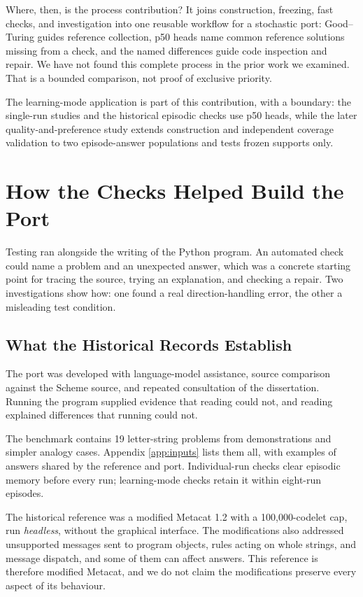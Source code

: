 \documentclass[10pt,letterpaper]{article}
\begin{document}
Where, then, is the process contribution? It joins construction, freezing, fast checks,
and investigation into one reusable workflow for a stochastic port: Good--Turing guides
reference collection, p50 heads name common reference solutions missing from a check, and
the named differences guide code inspection and repair. We have not found this complete
process in the prior work we examined. That is a bounded comparison, not proof of
exclusive priority.

The learning-mode application is part of this contribution, with a boundary: the
single-run studies and the historical episodic checks use p50 heads, while the later
quality-and-preference study extends construction and independent coverage validation to
two episode-answer populations and tests frozen supports only.

\section{How the Checks Helped Build the Port}\label{sec:case}

Testing ran alongside the writing of the Python program. An automated check could name a
problem and an unexpected answer, which was a concrete starting point for tracing the
source, trying an explanation, and checking a repair. Two investigations show how: one
found a real direction-handling error, the other a misleading test condition.

\subsection{What the Historical Records Establish}\label{sec:protocol}

The port was developed with language-model assistance, source comparison against the
Scheme source, and repeated consultation of the dissertation. Running the program supplied
evidence that reading could not, and reading explained differences that running could not.

The benchmark contains 19 letter-string problems from demonstrations and simpler analogy
cases. Appendix \ref{app:inputs} lists them all, with examples of answers shared by the
reference and port. Individual-run checks clear episodic memory before every run;
learning-mode checks retain it within eight-run episodes.

The historical reference was a modified Metacat 1.2 with a 100,000-codelet cap, run
\emph{headless}, without the graphical interface. The modifications also addressed
unsupported messages sent to program objects, rules acting on whole strings, and message
dispatch, and some of them can affect answers. This reference is therefore modified
Metacat, and we do not claim the modifications preserve every aspect of its behaviour.
\end{document}
